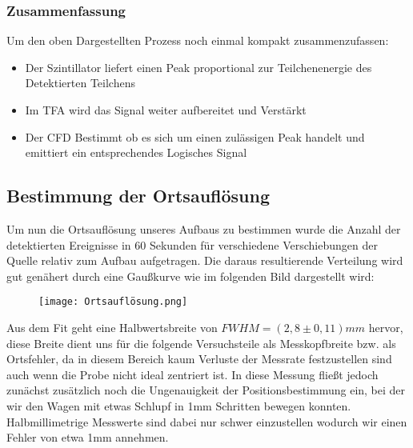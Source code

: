\documentclass{article}
\begin{document}
                \subsubsection{Zusammenfassung}
                Um den oben Dargestellten Prozess noch einmal kompakt zusammenzufassen:
                \begin{itemize}
                    \item Der Szintillator liefert einen Peak proportional zur Teilchenenergie des Detektierten Teilchens
                    \item Im TFA wird das Signal weiter aufbereitet und Verstärkt
                    \item Der CFD Bestimmt ob es sich um einen zulässigen Peak handelt und emittiert ein entsprechendes Logisches Signal
                \end{itemize}

        \subsection{Bestimmung der Ortsauflösung}
            Um nun die Ortsauflösung unseres Aufbaus zu bestimmen wurde die Anzahl der detektierten Ereignisse in 60 Sekunden
            für verschiedene Verschiebungen der Quelle relativ zum Aufbau aufgetragen. Die daraus resultierende Verteilung wird gut genähert durch eine
            Gaußkurve wie im folgenden Bild dargestellt wird:
            \begin{figure}[H]
                \centering
                \texttt{[image: Ortsauflösung.png]}
                \label{Plot der Ortsauflösungsmessung}
            \end{figure}
            Aus dem Fit geht eine Halbwertsbreite von $FWHM=(2,8\pm0,11)mm$ hervor, diese Breite dient uns für die folgende Versuchsteile als 
            Messkopfbreite bzw. als Ortsfehler, da in diesem Bereich kaum Verluste der Messrate festzustellen sind auch wenn die Probe nicht ideal
            zentriert ist. In diese Messung fließt jedoch zunächst zusätzlich noch die Ungenauigkeit der Positionsbestimmung ein, bei der wir den Wagen
            mit etwas Schlupf in 1mm Schritten bewegen konnten. Halbmillimetrige Messwerte sind dabei nur schwer einzustellen wodurch wir einen Fehler von
            etwa 1mm annehmen.
\end{document}
